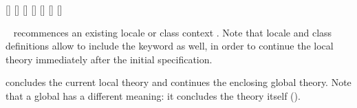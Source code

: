 \begin{isabellebody}
\begin{isamarkuptext}
  \begin{railoutput}
[]
[]
[]
\rail@end
{}
[]
[]
[]
[]
\rail@end
\end{railoutput}


  \begin{description}
  
  \item \hyperlink{command.context}{\mbox{}}~ recommences an
  existing locale or class context .  Note that locale and
  class definitions allow to include the \hyperlink{keyword.begin}{\mbox{}} keyword as
  well, in order to continue the local theory immediately after the
  initial specification.
  
  \item \hyperlink{command.local.end}{\mbox{}} concludes the current local theory
  and continues the enclosing global theory.  Note that a global
  \hyperlink{command.global.end}{\mbox{}} has a different meaning: it concludes the
  theory itself ().
  

\end{description}
\end{isamarkuptext}
\end{isabellebody}
